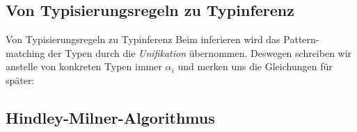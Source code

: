 \documentclass{beamer}
\begin{document}
\subsection{Von Typisierungsregeln zu Typinferenz}

\begin{frame}{Von Typisierungsregeln zu Typinferenz}
  Beim inferieren wird das Pattern-matching der Typen durch die \emph{Unifikation} übernommen.
  Deswegen schreiben wir anstelle von konkreten Typen immer $\alpha_i$ und merken uns die Gleichungen für später:



\end{frame}

\subsection{Hindley-Milner-Algorithmus}
\end{document}
